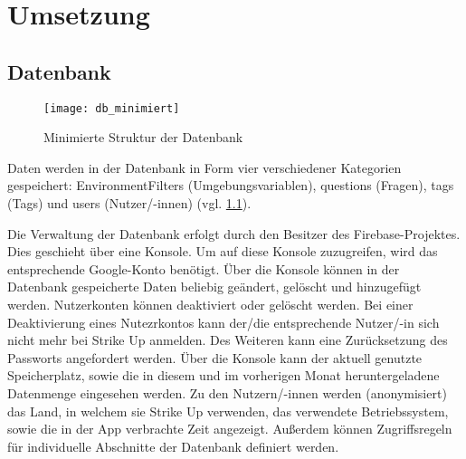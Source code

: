 \chapter{Umsetzung}
\label{ch:umsetzung}

\section{Datenbank}
\label{sec:datenbank}

\begin{figure}[htpb]
    \centering
    \texttt{[image: db\_minimiert]}
    \caption{Minimierte Struktur der Datenbank}
    \label{img:db_minimiert}
\end{figure}
Daten werden in der Datenbank in Form vier verschiedener Kategorien gespeichert: \glqq{}EnvironmentFilters\grqq{} (Umgebungsvariablen), \glqq{}questions\grqq{} (Fragen),
\glqq{}tags\grqq{} (Tags) und \glqq{}users\grqq{} (Nutzer/-innen) (vgl. \ref{img:db_minimiert}).

Die Verwaltung der Datenbank erfolgt durch den Besitzer des Firebase-Projektes. Dies geschieht über eine Konsole. Um auf diese Konsole zuzugreifen, wird das entsprechende Google-Konto benötigt. \newline
Über die Konsole können in der Datenbank gespeicherte Daten beliebig geändert, gelöscht und hinzugefügt werden. Nutzerkonten können deaktiviert oder gelöscht werden. \newline
Bei einer Deaktivierung eines Nutezrkontos kann der/die entsprechende Nutzer/-in sich nicht mehr bei Strike Up anmelden. Des Weiteren kann eine Zurücksetzung des Passworts angefordert werden. \newline
Über die Konsole kann der aktuell genutzte Speicherplatz, sowie die in diesem und im vorherigen Monat heruntergeladene Datenmenge eingesehen werden. \newline
Zu den Nutzern/-innen werden (anonymisiert) das Land, in welchem sie Strike Up verwenden, das verwendete Betriebssystem, sowie die in der App verbrachte Zeit angezeigt. \newline
Außerdem können Zugriffsregeln für individuelle Abschnitte der Datenbank definiert werden.

